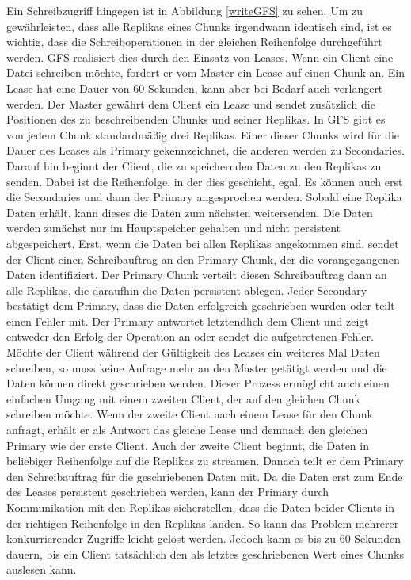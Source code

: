 \documentclass[12pt,oneside,a4paper,parskip]{scrbook}
\begin{document}
Ein Schreibzugriff hingegen ist in Abbildung \ref{writeGFS} zu sehen. Um zu gewährleisten, dass alle Replikas eines Chunks irgendwann identisch sind, ist es wichtig, dass die Schreiboperationen in der gleichen Reihenfolge durchgeführt werden. GFS realisiert dies durch den Einsatz von Leases. Wenn ein Client eine Datei schreiben möchte, fordert er vom Master ein Lease auf einen Chunk an. Ein Lease hat eine Dauer von 60 Sekunden, kann aber bei Bedarf auch verlängert werden. Der Master gewährt dem Client ein Lease und sendet zusätzlich die Positionen des zu beschreibenden Chunks und seiner Replikas. In GFS gibt es von jedem Chunk standardmäßig drei Replikas. Einer dieser Chunks wird für die Dauer des Leases als Primary gekennzeichnet, die anderen werden zu Secondaries. Darauf hin beginnt der Client, die zu speichernden Daten zu den Replikas zu senden. Dabei ist die Reihenfolge, in der dies geschieht, egal. Es können auch erst die Secondaries und dann der Primary angesprochen werden. Sobald eine Replika Daten erhält, kann dieses die Daten zum nächsten weitersenden. Die Daten werden zunächst nur im Hauptspeicher gehalten und nicht persistent abgespeichert. Erst, wenn die Daten bei allen Replikas angekommen sind, sendet der Client einen Schreibauftrag an den Primary Chunk, der die vorangegangenen Daten identifiziert. Der Primary Chunk verteilt diesen Schreibauftrag dann an alle Replikas, die daraufhin die Daten persistent ablegen. Jeder Secondary bestätigt dem Primary, dass die Daten erfolgreich geschrieben wurden oder teilt einen Fehler mit. Der Primary antwortet letztendlich dem Client und zeigt entweder den Erfolg der Operation an oder sendet die aufgetretenen Fehler. Möchte der Client während der Gültigkeit des Leases ein weiteres Mal Daten schreiben, so muss keine Anfrage mehr an den Master getätigt werden und die Daten können direkt geschrieben werden. Dieser Prozess ermöglicht auch einen einfachen Umgang mit einem zweiten Client, der auf den gleichen Chunk schreiben möchte. Wenn der zweite Client nach einem Lease für den Chunk anfragt, erhält er als Antwort das gleiche Lease und demnach den gleichen Primary wie der erste Client. Auch der zweite Client beginnt, die Daten in beliebiger Reihenfolge auf die Replikas zu streamen. Danach teilt er dem Primary den Schreibauftrag für die geschriebenen Daten mit. Da die Daten erst zum Ende des Leases persistent geschrieben werden, kann der Primary durch Kommunikation mit den Replikas sicherstellen, dass die Daten beider Clients in der richtigen Reihenfolge in den Replikas landen. So kann das Problem mehrerer konkurrierender Zugriffe leicht gelöst werden. Jedoch kann es bis zu 60 Sekunden dauern, bis ein Client tatsächlich den als letztes geschriebenen Wert eines Chunks auslesen kann.
\end{document}
